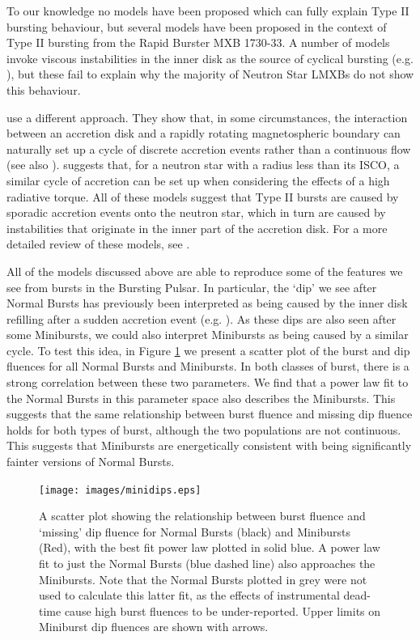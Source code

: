 \par To our knowledge no models have been proposed which can fully explain Type II bursting behaviour, but several models have been proposed in the context of Type II bursting from the Rapid Burster MXB 1730-33.  A number of models invoke viscous instabilities in the inner disk as the source of cyclical bursting (e.g. \citealp{Taam_Evo,Hayakawa_Type2Mod}), but these fail to explain why the majority of Neutron Star LMXBs do not show this behaviour.
\par \citet{Spruit_Type2Mod} use a different approach.  They show that, in some circumstances, the interaction between an accretion disk and a rapidly rotating magnetospheric boundary can naturally set up a cycle of discrete accretion events rather than a continuous flow  (see also \citealp{Dangelo_Episodic1,Dangelo_Episodic2,vandenEijnden_RB,Scaringi_Gating}).  \citet{Walker_Type2Mod} suggests that, for a neutron star with a radius less than its ISCO, a similar cycle of accretion can be set up when considering the effects of a high radiative torque.  All of these models suggest that Type II bursts are caused by sporadic accretion events onto the neutron star, which in turn are caused by instabilities that originate in the inner part of the accretion disk.  For a more detailed review of these models, see \citet{Lewin_Bursts}.
\par All of the models discussed above are able to reproduce some of the features we see from bursts in the Bursting Pulsar.  In particular, the `dip' we see after Normal Bursts has previously been interpreted as being caused by the inner disk refilling after a sudden accretion event (e.g. \citealp{Younes_Expo}).  As these dips are also seen after some Minibursts, we could also interpret Minibursts as being caused by a similar cycle.  To test this idea, in Figure \ref{fig:minidips} we present a scatter plot of the burst and dip fluences for all Normal Bursts and Minibursts.  In both classes of burst, there is a strong correlation between these two parameters.  We find that a power law fit to the Normal Bursts in this parameter space also describes the Minibursts.  This suggests that the same relationship between burst fluence and missing dip fluence holds for both types of burst, although the two populations are not continuous.  This suggests that Minibursts are energetically consistent with being significantly fainter versions of Normal Bursts.

\begin{figure}
  \centering
  \texttt{[image: images/minidips.eps]}
  \caption{\small A scatter plot showing the relationship between burst fluence and `missing' dip fluence for Normal Bursts (black) and Minibursts (Red), with the best fit power law plotted in solid blue.  A power law fit to just the Normal Bursts (blue dashed line) also approaches the Minibursts.  Note that the Normal Bursts plotted in grey were not used to calculate this latter fit, as the effects of instrumental dead-time cause high burst fluences to be under-reported.  Upper limits on Miniburst dip fluences are shown with arrows.}
  \label{fig:minidips}
\end{figure}

